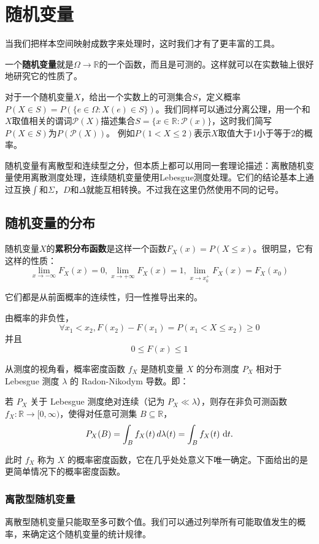 
\section{随机变量}
当我们把样本空间映射成数字来处理时，这时我们才有了更丰富的工具。

一个\textbf{随机变量}就是$\Omega\to \mathbb{R}$的一个函数，而且是可测的。这样就可以在实数轴上很好地研究它的性质了。

对于一个随机变量$X$，给出一个实数上的可测集合$S$，定义概率$P(X\in S)=P(\{e\in \Omega: X(e)\in S\})$。我们同样可以通过分离公理，用一个和$X$取值相关的谓词$\mathcal{P}(X)$描述集合$S=\{x\in \mathbb{R}:\mathcal{P}(x)\}$，这时我们简写$P(X\in S)$为$P(\mathcal{P}(X))$。
例如$P(1<X\leq 2)$表示$X$取值大于$1$小于等于$2$的概率。

随机变量有离散型和连续型之分，但本质上都可以用同一套理论描述：离散随机变量使用离散测度处理，连续随机变量使用Lebesgue测度处理。它们的结论基本上通过互换$\int$和$\Sigma$，$D$和$\Delta$就能互相转换。不过我在这里仍然使用不同的记号。

\subsection{随机变量的分布}

随机变量$X$的\textbf{累积分布函数}是这样一个函数$F_X(x)=P(X\leq x)$。很明显，它有这样的性质：
\[
\lim_{x\to -\infty} F_X(x)= 0, \lim_{x\to +\infty} F_X(x)= 1,\lim_{x\to x_0^+} F_X(x)= F_X(x_0)
\]

它们都是从前面概率的连续性，归一性推导出来的。

由概率的非负性，
\[
\forall x_1<x_2, F(x_2)-F(x_1)=P(x_1<X\leq x_2) \geq 0
\]
并且
\[
0\leq F(x)\leq 1
\]

从测度的视角看，概率密度函数 $f_X$ 是随机变量 $X$ 的分布测度 $P_X$ 相对于 Lebesgue 测度 $\lambda$ 的 Radon-Nikodym 导数。即：

若 $P_X$ 关于 Lebesgue 测度绝对连续（记为 $P_X \ll \lambda$），则存在非负可测函数 $f_X: \mathbb{R} \to [0, \infty)$，使得对任意可测集 $B \subseteq \mathbb{R}$，
\[
P_X(B) = \int_B f_X(t) \, d\lambda(t) = \int_B f_X(t) \, \mathop{}\!\mathrm{d} t.
\]

此时 $f_X$ 称为 $X$ 的概率密度函数，它在几乎处处意义下唯一确定。下面给出的是更简单情况下的概率密度函数。

\subsubsection{离散型随机变量}

离散型随机变量只能取至多可数个值。我们可以通过列举所有可能取值发生的概率，来确定这个随机变量的统计规律。

